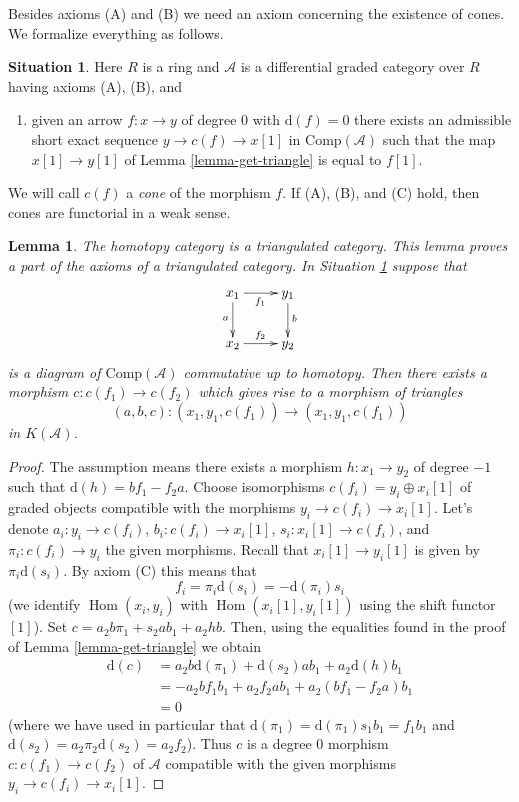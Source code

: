 \documentclass{stacks-project}
\newenvironment{slogan}{\comment}{\endcomment}
\theoremstyle{plain}
\newtheorem{lemma}[subsection]{Lemma}
\theoremstyle{definition}
\newtheorem{situation}[subsection]{Situation}
\theoremstyle{remark}
\numberwithin{equation}{subsection}
\def\Hom{\mathop{\mathrm{Hom}}\nolimits}
\begin{document}
\noindent
Besides axioms (A) and (B) we need an axiom concerning the existence of
cones. We formalize everything as follows.

\begin{situation}
\label{situation-ABC}
Here $R$ is a ring and $\mathcal{A}$ is a differential graded category
over $R$ having axioms (A), (B), and
\begin{enumerate}
\item[(C)] given an arrow $f : x \to y$ of degree $0$ with
$\text{d}(f) = 0$ there exists an admissible short exact sequence
$y \to c(f) \to x[1]$ in $\text{Comp}(\mathcal{A})$ such that the map
$x[1] \to y[1]$ of Lemma \ref{lemma-get-triangle} is equal to $f[1]$.
\end{enumerate}
\end{situation}

\noindent
We will call $c(f)$ a {\it cone} of the morphism $f$.
If (A), (B), and (C) hold, then
cones are functorial in a weak sense.

\begin{lemma}
\label{lemma-cone}
\begin{slogan}
The homotopy category is a triangulated category.
This lemma proves a part of the axioms of a triangulated category.
\end{slogan}
In Situation \ref{situation-ABC} suppose that
$$
\xymatrix{
x_1 \ar[r]_{f_1} \ar[d]_a & y_1 \ar[d]^b \\
x_2 \ar[r]^{f_2} & y_2
}
$$
is a diagram of $\text{Comp}(\mathcal{A})$ commutative up to homotopy.
Then there exists a morphism $c : c(f_1) \to c(f_2)$ which gives rise to
a morphism of triangles
$$
(a, b, c) : (x_1, y_1, c(f_1)) \to (x_1, y_1, c(f_1))
$$
in $K(\mathcal{A})$.
\end{lemma}

\begin{proof}
The assumption means there exists a morphism $h : x_1 \to y_2$ of degree
$-1$ such that $\text{d}(h) = b f_1 - f_2 a$. Choose isomorphisms
$c(f_i) = y_i \oplus x_i[1]$ of graded objects compatible with the
morphisms $y_i \to c(f_i) \to x_i[1]$. Let's denote
$a_i : y_i \to c(f_i)$, $b_i : c(f_i) \to x_i[1]$, $s_i : x_i[1] \to c(f_i)$,
and $\pi_i : c(f_i) \to y_i$ the given morphisms. Recall that
$x_i[1] \to y_i[1]$ is given by $\pi_i \text{d}(s_i)$. By axiom (C)
this means that
$$
f_i = \pi_i \text{d}(s_i) = - \text{d}(\pi_i) s_i
$$
(we identify $\Hom(x_i, y_i)$ with $\Hom(x_i[1], y_i[1])$
using the shift functor $[1]$).
Set $c = a_2 b \pi_1 + s_2 a b_1 + a_2hb$. Then, using the
equalities found in the proof of Lemma \ref{lemma-get-triangle}
we obtain
\begin{align*}
\text{d}(c)
& =
a_2 b \text{d}(\pi_1) + \text{d}(s_2) a b_1 + a_2 \text{d}(h) b_1 \\
& =
- a_2 b f_1 b_1 + a_2 f_2 a b_1 + a_2 (b f_1 - f_2 a) b_1 \\
& = 0
\end{align*}
(where we have used in particular that
$\text{d}(\pi_1) = \text{d}(\pi_1) s_1 b_1 = f_1 b_1$ and
$\text{d}(s_2) = a_2 \pi_2 \text{d}(s_2) = a_2 f_2$).
Thus $c$ is a degree $0$ morphism $c : c(f_1) \to c(f_2)$ of $\mathcal{A}$
compatible with the given morphisms $y_i \to c(f_i) \to x_i[1]$.
\end{proof}
\end{document}
